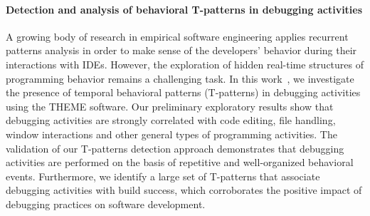 \paragraph{Detection and analysis of behavioral T-patterns in debugging activities}
A growing body of research in empirical software engineering applies recurrent patterns analysis in order to make sense  of the developers’ behavior during their interactions with IDEs. However, the exploration of hidden real-time structures of programming behavior remains a challenging task. In this work~\cite{sotovalero:hal-01763369}, we investigate the presence of temporal behavioral patterns (T-patterns) in debugging activities using the THEME software. Our preliminary exploratory results show that debugging activities are strongly correlated with code editing, file handling, window interactions and other general types of programming activities. The validation of our T-patterns detection approach demonstrates that debugging activities are performed on the basis of repetitive and well-organized behavioral events. Furthermore, we identify a large set of T-patterns that associate debugging activities with build success, which corroborates the positive impact of debugging practices on software development.






